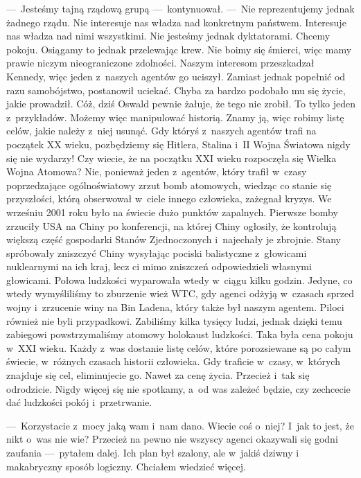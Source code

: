 ---~Jesteśmy tajną rządową grupą ---~kontynuował. ---~Nie reprezentujemy jednak żadnego rządu. Nie interesuje nas 
władza nad konkretnym państwem. Interesuje nas władza nad nimi wszystkimi. Nie jesteśmy jednak dyktatorami. Chcemy 
pokoju. Osiągamy to jednak przelewając krew. Nie boimy się śmierci, więc mamy prawie niczym nieograniczone zdolności. 
Naszym interesom przeszkadzał Kennedy, więc jeden z~naszych agentów go uciszył. Zamiast jednak popełnić od razu 
samobójstwo, postanowił uciekać. Chyba za bardzo podobało mu się życie, jakie prowadził. Cóż, dziś Oswald pewnie 
żałuje, że tego nie zrobił. To tylko jeden z~przykładów. Możemy więc manipulować historią. Znamy ją, więc robimy 
listę celów, jakie należy z~niej usunąć. Gdy któryś z~naszych agentów trafi na początek XX wieku, pozbędziemy się 
Hitlera, Stalina i~II Wojna Światowa nigdy się nie wydarzy! Czy wiecie, że na początku XXI wieku rozpoczęła się 
Wielka Wojna Atomowa? Nie, ponieważ jeden z~agentów, który trafił w~czasy poprzedzające ogólnoświatowy zrzut bomb 
atomowych, wiedząc co stanie się przyszłości, którą obserwował w~ciele innego człowieka, zażegnał kryzys. We wrześniu 
2001 roku było na świecie dużo punktów zapalnych. Pierwsze bomby zrzuciły USA na Chiny po konferencji, na której 
Chiny ogłosiły, że kontrolują większą część gospodarki Stanów Zjednoczonych i~najechały je zbrojnie. Stany spróbowały 
zniszczyć Chiny wysyłając pociski balistyczne z~głowicami nuklearnymi na ich kraj, lecz ci mimo zniszczeń 
odpowiedzieli własnymi głowicami. Połowa ludzkości wyparowała wtedy w~ciągu kilku godzin. Jedyne, co wtedy 
wymyśliliśmy to zburzenie wież WTC, gdy agenci odżyją w~czasach sprzed wojny i~zrzucenie winy na Bin Ladena, który 
także był naszym agentem. Piloci również nie byli przypadkowi. Zabiliśmy kilka tysięcy ludzi, jednak dzięki temu 
zabiegowi powstrzymaliśmy atomowy holokaust ludzkości. Taka była cena pokoju w~XXI wieku. Każdy z~was dostanie listę 
celów, które porozsiewane są po całym świecie, w~różnych czasach historii człowieka. Gdy traficie w~czasy, w~których 
znajduje się cel, eliminujecie go. Nawet za cenę życia. Przecież i~tak się odrodzicie. Nigdy więcej się nie spotkamy, 
a~od was zależeć będzie, czy zechcecie dać ludzkości pokój i~przetrwanie.

---~Korzystacie z~mocy jaką wam i~nam dano. Wiecie coś o~niej? I~jak to jest, że nikt o~was nie wie? Przecież na 
pewno nie wszyscy agenci okazywali się godni zaufania ---~pytałem dalej. Ich plan był szalony, ale w~jakiś dziwny i~
makabryczny sposób logiczny. Chciałem wiedzieć więcej.

